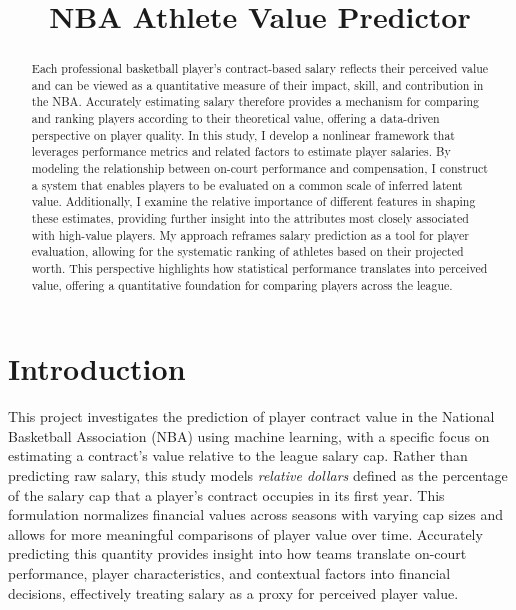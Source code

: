 \documentclass[conference]{IEEEtran}
\begin{document}
\title{NBA Athlete Value Predictor}

\author{
}

\maketitle

\begin{abstract}
    Each professional basketball player's contract-based salary reflects their perceived value and can be viewed as a quantitative measure of their impact, skill, and contribution in the NBA. Accurately estimating salary therefore provides a mechanism for comparing and ranking players according to their theoretical value, offering a data-driven perspective on player quality. In this study, I develop a nonlinear framework that leverages performance metrics and related factors to estimate player salaries. By modeling the relationship between on-court performance and compensation, I construct a system that enables players to be evaluated on a common scale of inferred latent value. Additionally, I examine the relative importance of different features in shaping these estimates, providing further insight into the attributes most closely associated with high-value players. My approach reframes salary prediction as a tool for player evaluation, allowing for the systematic ranking of athletes based on their projected worth. This perspective highlights how statistical performance translates into perceived value, offering a quantitative foundation for comparing players across the league.
\end{abstract}


\section{Introduction}

This project investigates the prediction of player contract value in the National Basketball Association (NBA) using machine learning, with a specific focus on estimating a contract's value relative to the league salary cap. Rather than predicting raw salary, this study models \textit{relative dollars} defined as the percentage of the salary cap that a player's contract occupies in its first year. This formulation normalizes financial values across seasons with varying cap sizes and allows for more meaningful comparisons of player value over time. Accurately predicting this quantity provides insight into how teams translate on-court performance, player characteristics, and contextual factors into financial decisions, effectively treating salary as a proxy for perceived player value.
\end{document}
